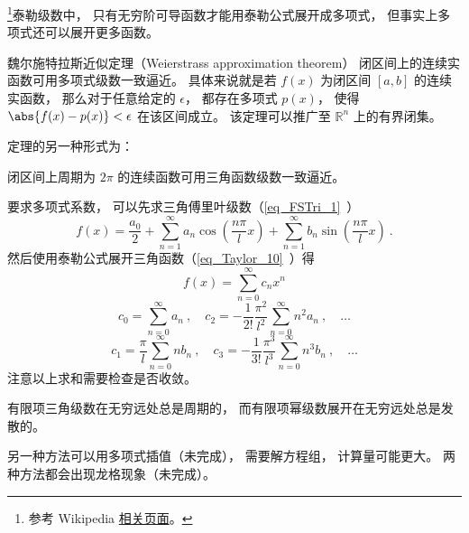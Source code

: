 \begin{issues}
\issueDraft
\end{issues}


\footnote{参考 Wikipedia \href{https://en.wikipedia.org/wiki/Stone–Weierstrass theorem}{相关页面}。}泰勒级数中， 只有无穷阶可导函数才能用泰勒公式展开成多项式， 但事实上多项式还可以展开更多函数。

\begin{theorem}{魏尔施特拉斯近似定理（Weierstrass approximation theorem）}
闭区间上的连续实函数可用多项式级数一致逼近。 具体来说就是若 $f(x)$ 为闭区间 $[a, b]$ 的连续实函数， 那么对于任意给定的 $\epsilon$， 都存在多项式 $p(x)$， 使得 $\abs{f(x) - p(x)} < \epsilon$ 在该区间成立。 该定理可以推广至 $\mathbb {R}^{n}$ 上的有界闭集。
\end{theorem}

定理的另一种形式为：
\begin{theorem}{}
闭区间上周期为 $2\pi$ 的连续函数可用三角函数级数一致逼近。
\end{theorem}

要求多项式系数， 可以先求三角傅里叶级数（\autoref{eq_FSTri_1}~）
\begin{equation}
f(x) = \frac{a_0}{2} + \sum_{n = 1}^\infty a_n \cos (\frac{n\pi}{l}x) + \sum_{n = 1}^\infty b_n \sin (\frac{n\pi}{l}x)~.
\end{equation}
然后使用泰勒公式展开三角函数（\autoref{eq_Taylor_10}~）得
\begin{equation}
f(x) = \sum_{n=0}^\infty c_n x^n
\end{equation}
\begin{equation}
c_0 = \sum_{n=0}^\infty a_n~,
\quad
c_2 = -\frac{1}{2!}\frac{\pi^2}{l^2} \sum_{n=0}^\infty n^2 a_n~, \quad \dots
\end{equation}
\begin{equation}
c_1 = \frac{\pi}{l} \sum_{n=0}^\infty n b_n~,
\quad
c_3 = -\frac{1}{3!}\frac{\pi^3}{l^3} \sum_{n=0}^\infty n^3 b_n~, \quad \dots
\end{equation}
注意以上求和需要检查是否收敛。

有限项三角级数在无穷远处总是周期的， 而有限项幂级数展开在无穷远处总是发散的。

另一种方法可以用多项式插值（未完成）， 需要解方程组， 计算量可能更大。 两种方法都会出现龙格现象（未完成）。
